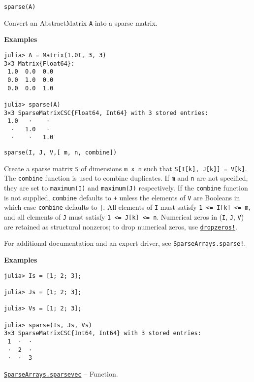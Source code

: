 \begin{adjustwidth}{2em}{0pt}


\begin{verbatim}
sparse(A)
\end{verbatim}

Convert an AbstractMatrix \texttt{A} into a sparse matrix.

\textbf{Examples}


\begin{verbatim}
julia> A = Matrix(1.0I, 3, 3)
3×3 Matrix{Float64}:
 1.0  0.0  0.0
 0.0  1.0  0.0
 0.0  0.0  1.0

julia> sparse(A)
3×3 SparseMatrixCSC{Float64, Int64} with 3 stored entries:
 1.0   ⋅    ⋅
  ⋅   1.0   ⋅
  ⋅    ⋅   1.0
\end{verbatim}




\begin{lstlisting}
sparse(I, J, V,[ m, n, combine])
\end{lstlisting}

Create a sparse matrix \texttt{S} of dimensions \texttt{m x n} such that \texttt{S[I[k], J[k]] = V[k]}. The \texttt{combine} function is used to combine duplicates. If \texttt{m} and \texttt{n} are not specified, they are set to \texttt{maximum(I)} and \texttt{maximum(J)} respectively. If the \texttt{combine} function is not supplied, \texttt{combine} defaults to \texttt{+} unless the elements of \texttt{V} are Booleans in which case \texttt{combine} defaults to \texttt{|}. All elements of \texttt{I} must satisfy \texttt{1 <= I[k] <= m}, and all elements of \texttt{J} must satisfy \texttt{1 <= J[k] <= n}. Numerical zeros in (\texttt{I}, \texttt{J}, \texttt{V}) are retained as structural nonzeros; to drop numerical zeros, use \hyperlink{13132808383029320263}{\texttt{dropzeros!}}.

For additional documentation and an expert driver, see \texttt{SparseArrays.sparse!}.

\textbf{Examples}


\begin{verbatim}
julia> Is = [1; 2; 3];

julia> Js = [1; 2; 3];

julia> Vs = [1; 2; 3];

julia> sparse(Is, Js, Vs)
3×3 SparseMatrixCSC{Int64, Int64} with 3 stored entries:
 1  ⋅  ⋅
 ⋅  2  ⋅
 ⋅  ⋅  3
\end{verbatim}



\end{adjustwidth}
\hypertarget{13364181309585533450}{}
\hyperlink{13364181309585533450}{\texttt{SparseArrays.sparsevec}}  -- {Function.}

